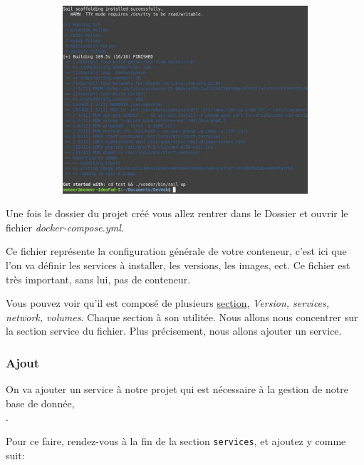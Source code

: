 \documentclass[internal]{nhitec_design}
\begin{document}
\begin{figure}[h]
\begin{subfigure}{0.3\textwidth}
                \includegraphics[width=\textwidth]{Images_formation/CreateProject2.pdf}
            \end{subfigure}
        \end{figure}


        Une fois le dossier du projet créé vous allez rentrer dans le Dossier et ouvrir le fichier \textit{docker-compose.yml}.

        Ce fichier représente la configuration générale de votre conteneur, c'est ici que l'on va définir les services à installer, les versions, les images, ect.
        Ce fichier est très important, sans lui, pas de conteneur.

        Vous pouvez voir qu'il est composé de plusieurs \href{https://docs.docker.com/compose/compose-file/}{section}, \textit{Version, services, network, volumes}. Chaque section à son utilitée. Nous allons nous concentrer sur la section service du fichier. Plus précisement, nous allons ajouter un service.\\ 


    \subsubsection[Ajout PhpMyAdmin]{Ajout \phpmyadmin{}}

        On va ajouter un service à notre projet qui est nécessaire à la gestion de notre base de donnée,\\ \phpmyadmin{}.
        
        Pour ce faire, rendez-vous à la fin de la section \verb|services|, et ajoutez y \phpmyadmin{} comme suit:
\end{document}
